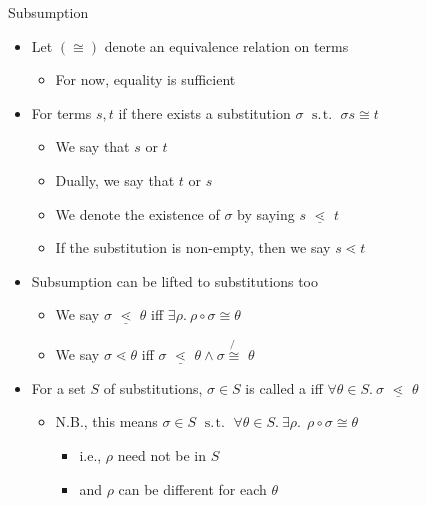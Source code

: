 \documentclass[pdf,fyma2]{prosper} %
\newcommand{\opr}[1]{\ensuremath{\operatorname{#1}}}
\newcommand{\suchthat}{\ensuremath{\opr{~s.\!t.~}}}
\newcommand{\isom}{\ensuremath{\cong}}
\newcommand{\notisom}{\ensuremath{\!\not{\!\!\isom\,}\,}}
\newcommand{\subsume}{\ensuremath{\lessdot}}
\newcommand{\subsumeq}{\ensuremath{\,\,\underline{\!\subsume\!}\,\,}}
\begin{document}
\begin{slide}{Subsumption}
	\begin{itemize}
	\item Let $(\isom)$ denote an equivalence relation on terms
    	\begin{itemize}
    	\item For now, equality is sufficient
    	\end{itemize}
	\item For terms $s,t$ if there exists a substitution $\sigma \suchthat \sigma s \isom t$
    	\begin{itemize}
	    \item We say that $s$  or  $t$
	    \item Dually, we say that $t$  or  $s$
	    \item We denote the existence of $\sigma$ by saying $s \subsumeq t$
    	\item If the substitution is non-empty, then we say $s \subsume t$
    	\end{itemize}
    \item Subsumption can be lifted to substitutions too
    	\begin{itemize}
    	\item We say $\sigma \subsumeq \theta$ iff $\exists \rho.~ \rho\circ\sigma \isom \theta$
    	\item We say $\sigma \subsume \theta$ iff $\sigma \subsumeq \theta \land \sigma \notisom \theta$
    	\end{itemize}
    \item For a set $S$ of substitutions, $\sigma\in S$ is called a  iff $\forall \theta\in S.~ \sigma \subsumeq \theta$
    	\begin{itemize}
    	\item N.B., this means $\sigma\in S \suchthat \forall \theta\in S.~ \exists \rho.~~ \rho\circ\sigma \isom \theta$
            \begin{itemize}
            \item i.e., $\rho$ need not be in $S$
            \item and $\rho$ can be different for each $\theta$
            \end{itemize}
    	\end{itemize}
	\end{itemize}
\end{slide}
\end{document}
